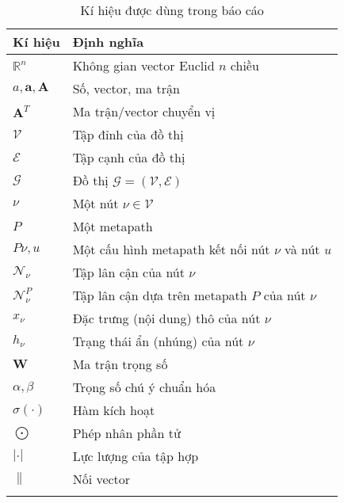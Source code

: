 \begin{table}[]
  \label{tb:01}
  \caption[]{Kí hiệu được dùng trong báo cáo}
  \begin{tabular}{ll}
  \hline
  \multicolumn{1}{|l|}{Kí hiệu} & \multicolumn{1}{l|}{Định nghĩa} \\ \hline
  \multicolumn{1}{|l|}{$\mathbb{R}^n$} & \multicolumn{1}{l|}{Không gian vector Euclid $n$ chiều} \\ \hline
  \multicolumn{1}{|l|}{$a, \mathbf{a}, \mathbf{A}$} & \multicolumn{1}{l|}{Số, vector, ma trận}   \\ \hline
  \multicolumn{1}{|l|}{$\mathbf{A}^T$} & \multicolumn{1}{l|}{Ma trận/vector chuyển vị}   \\ \hline
  \multicolumn{1}{|l|}{$\pmb{\mathcal{V}}$} & \multicolumn{1}{l|}{Tập đỉnh của đồ thị}   \\ \hline
  \multicolumn{1}{|l|}{$\pmb{\mathcal{E}}$} & \multicolumn{1}{l|}{Tập cạnh của đồ thị}   \\ \hline
  \multicolumn{1}{|l|}{$\pmb{\mathcal{G}}$} & \multicolumn{1}{l|}{Đồ thị $\pmb{\mathcal{G} = (\pmb{\mathcal{V}}, \pmb{\mathcal{E}})}$}   \\ \hline
  \multicolumn{1}{|l|}{$\nu$} & \multicolumn{1}{l|}{Một nút $\nu \in \pmb{\mathcal{V}}$}   \\ \hline
  \multicolumn{1}{|l|}{$P$} & \multicolumn{1}{l|}{Một metapath}   \\ \hline
  \multicolumn{1}{|l|}{$P{\nu, u}$} & \multicolumn{1}{l|}{Một cấu hình metapath kết nối nút $\nu$ và nút $u$}   \\ \hline
  \multicolumn{1}{|l|}{$\pmb{\mathcal{N}}_{\nu}$} & \multicolumn{1}{l|}{Tập lân cận của nút $\nu$}   \\ \hline
  \multicolumn{1}{|l|}{$\pmb{\mathcal{N}}^P_{\nu}$} & \multicolumn{1}{l|}{Tập lân cận dựa trên metapath $P$ của nút $\nu$}   \\ \hline
  \multicolumn{1}{|l|}{$x_{\nu}$} & \multicolumn{1}{l|}{Đặc trưng (nội dung) thô của nút $\nu$}   \\ \hline
  \multicolumn{1}{|l|}{$h_{\nu}$} & \multicolumn{1}{l|}{Trạng thái ẩn (nhúng) của nút $\nu$}   \\ \hline
  \multicolumn{1}{|l|}{$\mathbf{W}$} & \multicolumn{1}{l|}{Ma trận trọng số}   \\ \hline
  \multicolumn{1}{|l|}{$\alpha, \beta$} & \multicolumn{1}{l|}{Trọng số chú ý chuẩn hóa}   \\ \hline
  \multicolumn{1}{|l|}{$\sigma (\cdot)$} & \multicolumn{1}{l|}{Hàm kích hoạt}   \\ \hline
  \multicolumn{1}{|l|}{$\bigodot$} & \multicolumn{1}{l|}{Phép nhân phần tử}   \\ \hline
  \multicolumn{1}{|l|}{$|\cdot|$} & \multicolumn{1}{l|}{Lực lượng của tập hợp}   \\ \hline
  \multicolumn{1}{|l|}{$\parallel$} & \multicolumn{1}{l|}{Nối vector}   \\ \hline
                                &                                
  \end{tabular}
  \end{table}